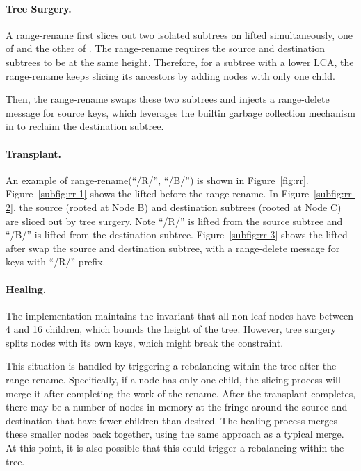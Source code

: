 \paragraph{Tree Surgery.}
A range-rename first slices out two isolated subtrees on lifted \bets
simultaneously, one of \spre and the other of \dpre.
The range-rename requires the source and destination subtrees to be at the same
height.
Therefore, for a subtree with a lower LCA, the range-rename keeps slicing its
ancestors by adding nodes with only one child.

Then, the range-rename swaps these two subtrees and injects a range-delete
message for source keys, which leverages the builtin garbage collection
mechanism in \fti to reclaim the destination subtree.

\paragraph{Transplant.}
An example of range-rename(``/R/'', ``/B/'') is shown in Figure~\ref{fig:rr}.
Figure~\ref{subfig:rr-1} shows the lifted \bet before the range-rename.
In Figure~\ref{subfig:rr-2}, the source (rooted at Node B) and destination
subtrees (rooted at Node C) are sliced out by tree surgery.
Note ``/R/'' is lifted from the source subtree and ``/B/'' is lifted from the
destination subtree.
Figure~\ref{subfig:rr-3} shows the lifted \bet after swap the source and
destination subtree, with a range-delete message for keys with ``/R/'' prefix.

\paragraph{Healing.}
The \fti implementation maintains the invariant that all non-leaf nodes have
between 4 and 16 children, which bounds the height of the tree.
However, tree surgery splits nodes with its own keys, which might break the
constraint.

This situation is handled by triggering a rebalancing within the tree after
the range-rename.
Specifically, if a node has only one child, the slicing process will merge
it after completing the work of the rename.
After the transplant completes, there may be a number of \bet nodes in memory at
the fringe around the source and destination that have fewer children than
desired.
The healing process merges these smaller nodes back together,
using the same approach as a typical \bet merge.
At this point, it is also possible that this could trigger a rebalancing within
the tree.

